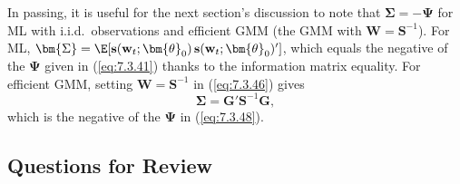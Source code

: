 In passing, it is useful for the next section's discussion to note that $\bm{\Sigma} = -\bm{\Psi}$ for ML with i.i.d.\ observations and efficient GMM (the GMM with $\mathbf{W} = \mathbf{S}^{-1}$). For ML, $\bm{\Sigma} = \E[\mathbf{s}(\mathbf{w}_t; \bm{\theta}_0)\,\mathbf{s}(\mathbf{w}_t; \bm{\theta}_0)']$, which equals the negative of the $\bm{\Psi}$ given in (\ref{eq:7.3.41}) thanks to the information matrix equality. For efficient GMM, setting $\mathbf{W} = \mathbf{S}^{-1}$ in (\ref{eq:7.3.46}) gives
\begin{equation}
\label{eq:7.3.49}
\bm{\Sigma} = \mathbf{G}'\mathbf{S}^{-1}\mathbf{G},
\end{equation}
which is the negative of the $\bm{\Psi}$ in (\ref{eq:7.3.48}).

\subsection*{Questions for Review}


